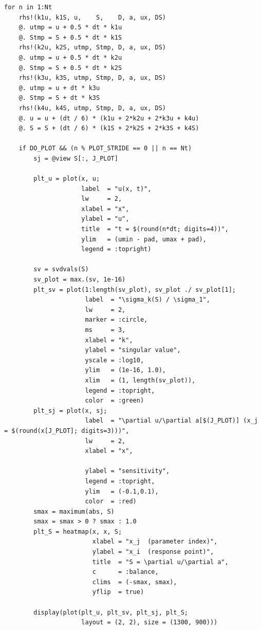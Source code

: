 \documentclass[11pt]{report}
\begin{document}
\begin{verbatim}
for n in 1:Nt
    rhs!(k1u, k1S, u,    S,    D, a, ux, DS)
    @. utmp = u + 0.5 * dt * k1u
    @. Stmp = S + 0.5 * dt * k1S
    rhs!(k2u, k2S, utmp, Stmp, D, a, ux, DS)
    @. utmp = u + 0.5 * dt * k2u
    @. Stmp = S + 0.5 * dt * k2S
    rhs!(k3u, k3S, utmp, Stmp, D, a, ux, DS)
    @. utmp = u + dt * k3u
    @. Stmp = S + dt * k3S
    rhs!(k4u, k4S, utmp, Stmp, D, a, ux, DS)
    @. u = u + (dt / 6) * (k1u + 2*k2u + 2*k3u + k4u)
    @. S = S + (dt / 6) * (k1S + 2*k2S + 2*k3S + k4S)

    if DO_PLOT && (n % PLOT_STRIDE == 0 || n == Nt)
        sj = @view S[:, J_PLOT]

        plt_u = plot(x, u;
                     label  = "u(x, t)",
                     lw     = 2,
                     xlabel = "x",
                     ylabel = "u",
                     title  = "t = $(round(n*dt; digits=4))",
                     ylim   = (umin - pad, umax + pad),
                     legend = :topright)
    
        sv = svdvals(S)
        sv_plot = max.(sv, 1e-16)
        plt_sv = plot(1:length(sv_plot), sv_plot ./ sv_plot[1];
                      label  = "\sigma_k(S) / \sigma_1",
                      lw     = 2,
                      marker = :circle,
                      ms     = 3,
                      xlabel = "k",
                      ylabel = "singular value",
                      yscale = :log10,
                      ylim   = (1e-16, 1.0),
                      xlim   = (1, length(sv_plot)),
                      legend = :topright,
                      color  = :green)
        plt_sj = plot(x, sj;
                      label  = "\partial u/\partial a[$(J_PLOT)] (x_j = $(round(x[J_PLOT]; digits=3)))",
                      lw     = 2,
                      xlabel = "x",

                      ylabel = "sensitivity",
                      legend = :topright,
                      ylim   = (-0.1,0.1),
                      color  = :red)
        smax = maximum(abs, S)
        smax = smax > 0 ? smax : 1.0
        plt_S = heatmap(x, x, S;
                        xlabel = "x_j  (parameter index)",
                        ylabel = "x_i  (response point)",
                        title  = "S = \partial u/\partial a",
                        c      = :balance,
                        clims  = (-smax, smax),
                        yflip  = true)

        display(plot(plt_u, plt_sv, plt_sj, plt_S;
                     layout = (2, 2), size = (1300, 900)))


\end{verbatim}
\end{document}
